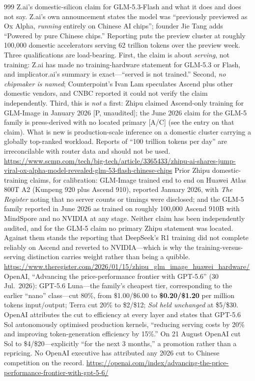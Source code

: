 \begin{thebibliography}{999}
 Z.ai's domestic-silicon claim for GLM-5.3-Flash and what it does and does not say. Z.ai's own announcement states the model was ``previously previewed as Ox Alpha, \emph{running} entirely on Chinese AI chips''; founder Jie Tang adds ``Powered by pure Chinese chips.'' Reporting puts the preview cluster at roughly 100{,}000 domestic accelerators serving 62 trillion tokens over the preview week. Three qualifications are load-bearing. First, the claim is about \emph{serving}, not training: Z.ai has made no training-hardware statement for GLM-5.3 or Flash, and implicator.ai's summary is exact---``served is not trained.'' Second, \emph{no chipmaker is named}; Counterpoint's Ivan Lam speculates Ascend plus other domestic vendors, and CNBC reported it could not verify the claim independently. Third, this is \emph{not} a first: Zhipu claimed Ascend-only training for GLM-Image in January 2026 [P, unaudited]; the June 2026 claim for the GLM-5 family is press-derived with no located primary [A/C] (see the entry on that claim). What is new is production-scale inference on a domestic cluster carrying a globally top-ranked workload. Reports of ``100 trillion tokens per day'' are irreconcilable with router data and should not be used. \url{https://www.scmp.com/tech/big-tech/article/3365433/zhipu-ai-shares-jump-viral-ox-alpha-model-revealed-glm-53-flash-chinese-chips}
 Prior Zhipu domestic-training claims, for calibration: GLM-Image trained end to end on Huawei Atlas 800T A2 (Kunpeng 920 plus Ascend 910), reported January 2026, with \emph{The Register} noting that no server counts or timings were disclosed; and the GLM-5 family reported in June 2026 as trained on roughly 100{,}000 Ascend 910B with MindSpore and no NVIDIA at any stage. Neither claim has been independently audited, and for the GLM-5 claim no primary Zhipu statement was located. Against them stands the reporting that DeepSeek's R1 training did not complete reliably on Ascend and reverted to NVIDIA---which is why the training-versus-serving distinction carries weight rather than being a quibble. \url{https://www.theregister.com/2026/01/15/zhipu_glm_image_huawei_hardware/}
 OpenAI, ``Advancing the price-performance frontier with GPT-5.6'' (30 Jul.\ 2026): GPT-5.6 Luna---the family's cheapest tier, corresponding to the earlier ``nano'' class---cut 80\%, from \$1.00/\$6.00 to \textbf{\$0.20/\$1.20} per million tokens input/output; Terra cut 20\% to \$2/\$12; \emph{Sol held unchanged} at \$5/\$30. OpenAI attributes the cut to efficiency at every layer and states that GPT-5.6 Sol autonomously optimised production kernels, ``reducing serving costs by 20\% and improving token-generation efficiency by 15\%.'' On 21 August OpenAI cut Sol to \$4/\$20---explicitly ``for the next 3 months,'' a promotion rather than a repricing. No OpenAI executive has attributed any 2026 cut to Chinese competition on the record. \url{https://openai.com/index/advancing-the-price-performance-frontier-with-gpt-5-6/}

\end{thebibliography}
